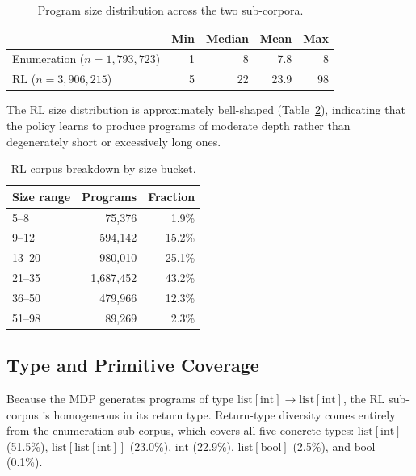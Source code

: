 \documentclass[11pt,a4paper]{article}
\begin{document}
\begin{table}[h]
\centering
\caption{Program size distribution across the two sub-corpora.}
\label{tab:size-dist}
\begin{tabular}{lrrrr}
\toprule
 & Min & Median & Mean & Max \\
\midrule
Enumeration ($n = 1{,}793{,}723$) & 1 & 8 & 7.8 & 8 \\
RL ($n = 3{,}906{,}215$)          & 5 & 22 & 23.9 & 98 \\
\bottomrule
\end{tabular}
\end{table}

The RL size distribution is approximately bell-shaped (Table~\ref{tab:rl-buckets}),
indicating that the policy learns to produce programs of moderate depth rather
than degenerately short or excessively long ones.

\begin{table}[h]
\centering
\caption{RL corpus breakdown by size bucket.}
\label{tab:rl-buckets}
\begin{tabular}{lrr}
\toprule
Size range & Programs & Fraction \\
\midrule
5--8   &     75{,}376 &  1.9\% \\
9--12  &    594{,}142 & 15.2\% \\
13--20 &    980{,}010 & 25.1\% \\
21--35 &  1{,}687{,}452 & 43.2\% \\
36--50 &    479{,}966 & 12.3\% \\
51--98 &     89{,}269 &  2.3\% \\
\bottomrule
\end{tabular}
\end{table}

\subsection{Type and Primitive Coverage}\label{sec:coverage}

Because the MDP generates programs of type
$\mathrm{list}[\mathrm{int}] \to \mathrm{list}[\mathrm{int}]$, the RL
sub-corpus is homogeneous in its return type.  Return-type diversity comes
entirely from the enumeration sub-corpus, which covers all five concrete
types: $\mathrm{list}[\mathrm{int}]$ (51.5\%),
$\mathrm{list}[\mathrm{list}[\mathrm{int}]]$ (23.0\%),
$\mathrm{int}$ (22.9\%), $\mathrm{list}[\mathrm{bool}]$ (2.5\%), and
$\mathrm{bool}$ (0.1\%).
\end{document}
